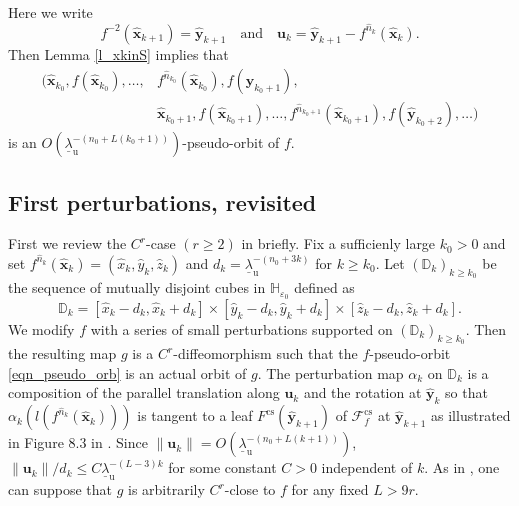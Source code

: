 \documentclass{amsart}
\theoremstyle{plain}
\theoremstyle{definition}
\numberwithin{equation}{section}
\numberwithin{figure}{section}
\def\bx{{\boldsymbol{x}}}
\def\by{{\boldsymbol{y}}}
\def\bu{{\boldsymbol{u}}}
\def\wh{\widehat}
\def\ve{\varepsilon}
\def\ul{\underline}
\def\cs{{\mathrm{cs}}}
\def\ru{{\mathrm{u}}}
\def\cf{{\mathcal{F}}}
\begin{document}
Here we write 
\[
f^{-2}(\widehat{\boldsymbol{x}}_{k+1})=\wh\by_{k+1}\quad\text{and}\quad
\bu_k=\wh\by_{k+1}-f^{\widehat n_k}(\widehat{\boldsymbol{x}}_k).
\]
Then Lemma \ref{l_xkinS} implies that 
\begin{equation}\label{eqn_pseudo_orb}
\begin{split}
\bigl(\widehat{\boldsymbol{x}}_{k_0}, f(\widehat{\boldsymbol{x}}_{k_0}),\dots,&f^{\widehat{n}_{k_0}}(\widehat{\boldsymbol{x}}_{k_0}), 
f(\widehat{\boldsymbol{y}}_{k_0+1}),\\
&\widehat{\boldsymbol{x}}_{k_0+1}, f(\widehat{\boldsymbol{x}}_{k_0+1}),\dots,f^{\widehat{n}_{k_0+1}}(\widehat{\boldsymbol{x}}_{k_0+1}),f(\widehat{\boldsymbol{y}}_{k_0+2}),\dots\bigr)
\end{split}
\end{equation}
is an $O(\underline{\lambda}_{\mathrm{u}}^{-(n_0+L(k_0+1))})$-pseudo-orbit of $f$.





\subsection{First perturbations, revisited}\label{ss_first perturb}

First we review the $C^r$-case $(r\geq 2)$ in \cite{KNS} briefly.
Fix a sufficienly large $k_0>0$ and set $f^{\wh n_k}(\wh\bx_k)=(\wh x_k,\wh y_k,\wh z_k)$ and $d_k=\ul{\lambda}_{\ru}^{-(n_0+3k)}$ for $k\geq k_0$.
Let $(\mathbb{D}_k)_{k\geq k_0}$ be the sequence of mutually disjoint cubes in $\mathbb{H}_{\ve_0}$ 
defined as 
\[
\mathbb{D}_k=[\wh x_k-d_k, \wh x_k+d_k]\times 
[\wh y_k-d_k, \wh y_k+d_k]\times [\wh z_k-d_k, \wh z_k+d_k].
\]
We modify $f$ with a series of small perturbations supported on 
$(\mathbb{D}_k)_{k\geq k_0}$.
Then the resulting map $g$ is a $C^r$-diffeomorphism such that 
the $f$-pseudo-orbit \eqref{eqn_pseudo_orb} is an actual orbit of $g$.
The perturbation map $\alpha_k$ on $\mathbb{D}_k$ is a composition of the parallel 
translation along $\bu_k$ and the rotation at $\wh\by_k$ so that 
$\alpha_k(l(f^{\wh n_k}(\wh\bx_k)))$ is tangent to a leaf $F^{\cs}(\wh \by_{k+1})$ of $\cf_f^{\cs}$ at $\wh\by_{k+1}$ 
as illustrated in Figure 8.3 in \cite{KNS}.
Since $\|\bu_k\|=O(\underline{\lambda}_{\mathrm{u}}^{-(n_0+L(k+1))})$, 
$\|\bu_k\|/d_k\leq C\ul{\lambda}_{\ru}^{-(L-3)k}$ for some constant $C>0$  independent of 
$k$. 
As in \cite[Subsection 8.2]{KNS}, one can suppose that $g$ is arbitrarily $C^r$-close to $f$ 
for any fixed $L>9r$.
\end{document}

